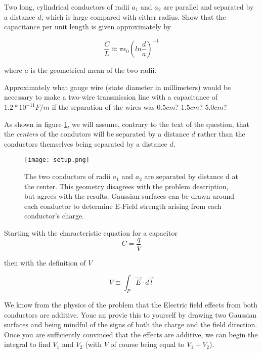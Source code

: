 
\begin{question}
Two long, cylindrical conductors of radii $a_1$ and $a_2$ are parallel
and separated by a distance $d$, which is large compared with either
radius. Show that the capacitance per unit length is given
approximately by

\begin{equation}
  \frac C L \approx \pi \epsilon_0 \left( ln \frac d a \right)^{-1}
\end{equation}


where $a$ is the geometrical mean of the two radii.

Approximately what gauge wire (state diameter in millimeters) would be
necessary to make a two-wire transmission line with a capacitance of
$1.2 * 10^{-11} F/m$ if the separation of the wires was $0.5 cm$? $1.5
cm$? $5.0 cm$?
\end{question}

As shown in figure \ref{fig:1:7:setup}, we will assume, contrary to
the text of the question, that the \emph{centers} of the condutors
will be separated by a distance $d$ rather than the conductors
themselves being separated by a distance $d$.

\begin{figure}[h]
  \begin{center}

    \texttt{[image: setup.png]}

    \caption{The two conductors of radii $a_1$ and $a_2$ are separated by
      distance d at the center.  This geometry disagrees with the
      problem description, but agrees with the results.  Gaussian
      surfaces can be drawn around each conductor to determine E-Field
      strength arising from each conductor's charge.}

    \label{fig:1:7:setup}

  \end{center}
\end{figure}

Starting with the characteristic equation for a capacitor
\begin{equation}
  C = \frac q V
\end{equation}

then with the definition of $V$

\begin{equation}
    V \equiv \int_P \vec{E} \cdot d\vec{l}
\end{equation}

We know from the physics of the problem that the Electric field
effects from both conductors are additive.  Youc an provie this to
yourself by drawing two Gaussian surfaces and being mindful of the
signs of both the charge and the field direction.  Once you are
sufficiently convinced that the effects are additive, we can begin the
integral to find $V_1$ and $V_2$ (with $V$ of course being equal to
$V_1 + V_2$).

